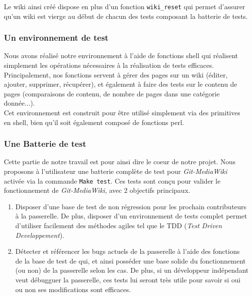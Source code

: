 \documentclass[11pt]{article}
\begin{document}
Le wiki ainsi créé dispose en plus d'un fonction 
\lstinline!wiki_reset! qui permet d'assurer qu'un wiki est vierge
au début de chacun des tests composant la batterie de tests.

\subsubsection{Un environnement de test}
Nous avons réalisé notre environnement à l'aide de fonctions shell qui réalisent simplement les opérations nécessaires à la réalisation de tests efficaces.\\
Principalement, nos fonctions servent à gérer des pages sur un wiki (éditer, ajouter, supprimer, récupérer), et également à faire des tests sur le contenu de pages (comparaisons de contenu, de nombre de pages dans une catégorie donnée...).\\
Cet environnement est construit pour être utilisé simplement via des primitives en shell, bien qu'il soit également composé de fonctions perl.\\

\subsubsection{Une Batterie de test}

Cette partie de notre travail est pour ainsi dire le coeur 
de notre projet. Nous proposons à l'utilisateur une batterie complète
de test pour \textit{Git-MediaWiki} activée via la commande 
\lstinline!Make test!. Ces tests sont conçu pour valider le 
fonctionnement de \textit{Git-MediaWiki}, avec 2 objectifs principaux.

\begin{enumerate}
\item Disposer d'une base de test de non régression pour les prochain 
  contributeurs à la passerelle. De plus, disposer d'un environnement de 
  tests complet permet d'utiliser facilement des méthodes agiles tel que
  le TDD (\textit{Test Driven Developpement}). \\
\item Détecter et référencer les bugs actuels de la passerelle à l'aide
  des fonctions de la base de test de qui, et ainsi posséder une base 
  solide du fonctionnement (ou non) de la passerelle selon les cas. De
  plus, si un développeur indépendant veut débugguer la passerelle, ces 
  tests lui seront très utile pour savoir si oui ou non ses modifications
  sont efficaces.
\end{enumerate}
\end{document}
